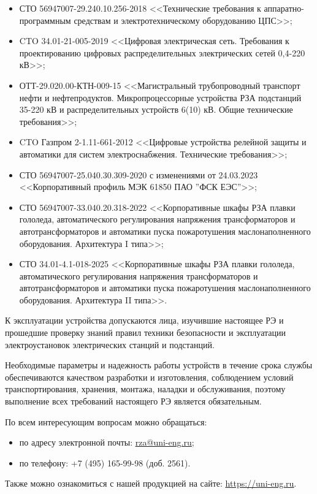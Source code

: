 \begin{itemize}
\item СТО 56947007-29.240.10.256-2018 <<Технические требования к аппаратно-программным средствам и электротехническому оборудованию ЦПС>>;
\item CTO 34.01-21-005-2019 <<Цифровая электрическая сеть. Требования к проектированию цифровых распределительных электрических сетей 0,4-220 кВ>>;
\item \sloppy ОТТ-29.020.00-КТН-009-15 <<Магистральный трубопроводный транспорт нефти и нефтепродуктов. Микропроцессорные устройства РЗА подстанций 35-220 кВ и распределительных устройств 6(10) кВ. Общие технические требования>>;
\item CTO Газпром 2-1.11-661-2012 <<Цифровые устройства релейной защиты и автоматики для систем электроснабжения. Технические требования>>;
\item СТО 56947007-25.040.30.309-2020 с изменениями от 24.03.2023 <<Корпоративный профиль МЭК 61850 ПАО ''ФСК ЕЭС''>>;
\item СТО 56947007-33.040.20.318-2022 <<Корпоративные шкафы РЗА плавки гололеда, автоматического регулирования напряжения трансформаторов и автотрансформаторов и автоматики пуска пожаротушения маслонаполненного оборудования. Архитектура I типа>>;
\item СТО 34.01-4.1-018-2025 <<Корпоративные шкафы РЗА плавки гололеда, автоматического регулирования напряжения трансформаторов и автотрансформаторов и автоматики пуска пожаротушения маслонаполненного оборудования. Архитектура II типа>>.

\end{itemize}

\par
К эксплуатации устройства допускаются лица, изучившие настоящее РЭ и прошедшие проверку знаний правил техники безопасности и эксплуатации электроустановок электрических станций и подстанций.

\par
Необходимые параметры и надежность работы устройств в течение срока службы обеспечиваются качеством разработки и изготовления, соблюдением условий транспортирования, хранения, монтажа, наладки и обслуживания, поэтому выполнение всех требований настоящего РЭ является обязательным.
\par
По всем интересующим вопросам можно обращаться:
\begin{itemize}
\item по адресу электронной почты: \href{mailto:rza@uni-eng.ru}{\color{uniblue}\uline{rza@uni-eng.ru}};
\item по телефону: +7 (495) 165-99-98 (доб. 2561).
\end{itemize}
Также можно ознакомиться с нашей продукцией на сайте: \href{https://uni-eng.ru}{\color{uniblue}\uline{https://uni-eng.ru}}.


